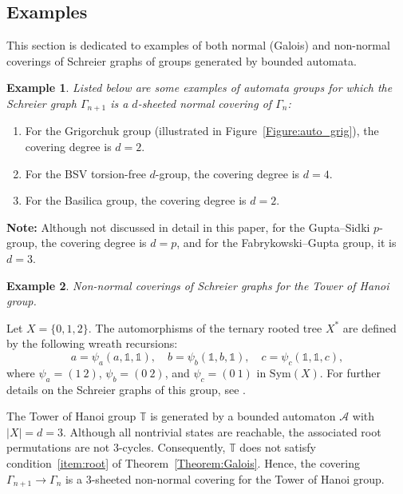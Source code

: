 \documentclass{article}
\newtheorem{myexa}{Example}[section]
\newcommand{\A}{\mathcal{A}}
\newcommand{\G}{\Gamma}
\newcommand{\id}{\mathds{1}}
\begin{document}
\subsection{Examples}
This section is dedicated to examples of both normal (Galois) and non-normal coverings of Schreier graphs of groups generated 
by bounded automata.

\begin{myexa} 
Listed below are some examples of automata groups for which the Schreier graph $\G_{n+1}$ is a $d$-sheeted normal covering of $\G_n$:
\end{myexa}
\begin{enumerate}
	\item \label{Example:Grigorchuk-normal} For the Grigorchuk group (illustrated in Figure~\ref{Figure:auto_grig}), the covering degree is $d = 2$.  
	\item \label{Example:BSV-normal} For the BSV torsion-free $d$-group, the covering degree is $d = 4$.
	\item \label{Example:Basilica-normal} For the Basilica group, the covering degree is $d = 2$.
\end{enumerate} 

\noindent\textbf{Note:} Although not discussed in detail in this paper, for the Gupta--Sidki $p$-group, the covering degree is $d = p$, and for the Fabrykowski--Gupta group, it is $d = 3$.

\begin{myexa} \label{Example:all-nonnormal} 
Non-normal coverings of Schreier graphs for the Tower of Hanoi group.
\end{myexa} Let $X = \{0,1,2\}$. The automorphisms of the ternary rooted tree $X^*$ are defined by the following wreath recursions:
\begin{equation} 
\label{Equation:wr-tower-group}
a = \psi_a(a, \id, \id),\quad b = \psi_b(\id, b, \id),\quad c = \psi_c(\id, \id, c),
\end{equation}
where $\psi_a = (1~2)$, $\psi_b = (0~2)$, and $\psi_c = (0~1)$ in $\mathrm{Sym}(X)$. For further details on the Schreier graphs of this group, see \cite{DAngeli2012counting}.

The Tower of Hanoi group $\mathbb{T}$ is generated by a bounded automaton $\A$ with $|X| = d = 3$. Although all nontrivial states are reachable, the associated root permutations are not $3$-cycles. Consequently, $\mathbb{T}$ does not satisfy condition~\eqref{item:root} of Theorem~\ref{Theorem:Galois}. Hence, the covering $\G_{n+1} \to \G_n$ is a $3$-sheeted non-normal covering for the Tower of Hanoi group.
\end{document}
